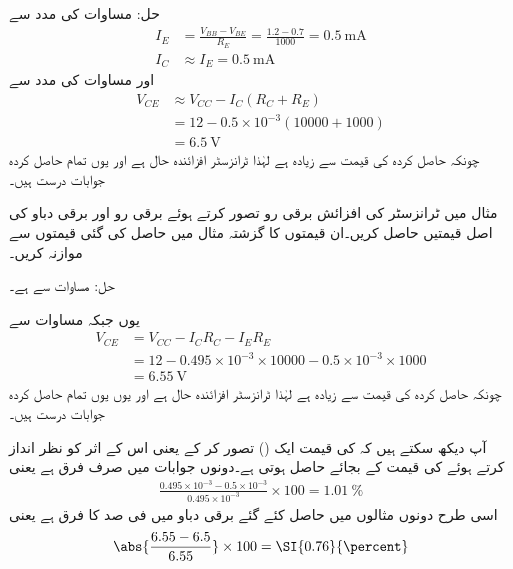 حل:	مساوات   کی مدد سے
\begin{align*}
I_E&=\frac{V_{BB}-V_{BE}}{R_E} = \frac{1.2-0.7}{1000}=\SI{0.5}{\milli \ampere}\\
I_C& \approx I_E = \SI{0.5}{\milli \ampere}
\end{align*}
اور مساوات   کی مدد سے
\begin{align*}
V_{CE} & \approx V_{CC}-I_C (R_C+R_E)\\
& =12-0.5 \times 10^{-3} (10000+1000)\\
&=\SI{6.5}{\volt}
\end{align*}
	چونکہ حاصل کردہ  کی قیمت سے زیادہ ہے لہٰذا ٹرانزسٹر افزائندہ حال ہے اور یوں تمام حاصل کردہ جوابات درست ہیں۔


مثال  میں ٹرانزسٹر کی افزائش برقی رو  تصور کرتے ہوئے برقی رو  اور برقی دباو  کی اصل قیمتیں حاصل کریں۔ان قیمتوں کا گزشتہ مثال میں حاصل کی گئی قیمتوں سے موازنہ کریں۔

حل:
	مساوات   سے   ہے۔

یوں جبکہ مساوات    سے
\begin{align*}
V_{CE} &= V_{CC} -I_C R_C - I_E R_E\\
&=12-0.495 \times 10^{-3} \times 10000-0.5 \times 10^{-3} \times 1000\\
&=\SI{6.55}{\volt}
\end{align*}
چونکہ حاصل کردہ  کی قیمت  سے زیادہ ہے لہٰذا ٹرانزسٹر  افزائندہ حال ہے اور یوں یوں تمام حاصل کردہ جوابات درست ہیں۔

آپ دیکھ سکتے ہیں کہ   کی قیمت ایک () تصور کر کے یعنی اس کے اثر کو نظر انداز کرتے ہوئے  کی قیمت   کے بجائے  حاصل ہوتی ہے۔دونوں جوابات میں صرف   فرق ہے یعنی
\begin{align*}
\frac{0.495 \times 10^{-3} -0.5 \times 10^{-3}}{0.495 \times 10^{-3}} \times 100 = \SI{1.01}{\percent}
\end{align*}
اسی طرح دونوں مثالوں میں حاصل کئے گئے برقی دباو   میں   فی صد کا فرق ہے یعنی
\begin{align*}
\abs{\frac{6.55-6.5}{6.55}} \times 100 = \SI{0.76}{\percent}
\end{align*}

